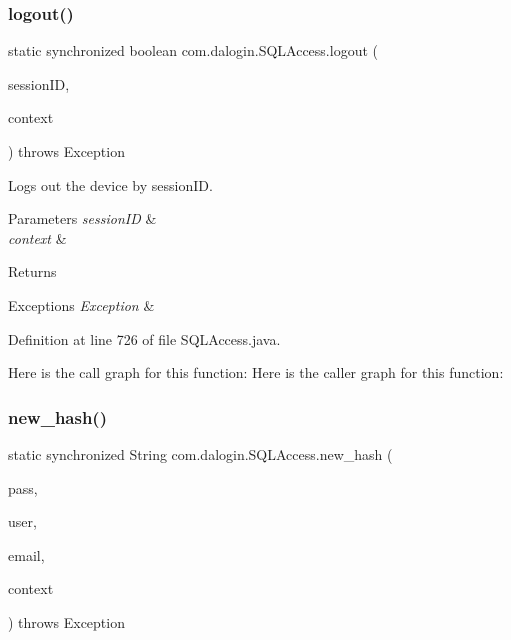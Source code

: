 \subsubsection{\texorpdfstring{logout()}{logout()}}
{\footnotesize\ttfamily static synchronized boolean com.\+dalogin.\+S\+Q\+L\+Access.\+logout (\begin{DoxyParamCaption}\item[{String}]{session\+ID,  }\item[{Servlet\+Context}]{context }\end{DoxyParamCaption}) throws Exception\hspace{0.3cm}{\ttfamily [static]}}

Logs out the device by session\+ID.


\begin{DoxyParams}{Parameters}
{\em session\+ID} & \\
\hline
{\em context} & \\
\hline
\end{DoxyParams}
\begin{DoxyReturn}{Returns}

\end{DoxyReturn}

\begin{DoxyExceptions}{Exceptions}
{\em Exception} & \\
\hline
\end{DoxyExceptions}


Definition at line 726 of file S\+Q\+L\+Access.\+java.

Here is the call graph for this function\+:
Here is the caller graph for this function\+:
\mbox{\label{classcom_1_1dalogin_1_1_s_q_l_access_ac1bccabf13fc7e4268eb1a169aec2aac}} 
\subsubsection{\texorpdfstring{new\+\_\+hash()}{new\_hash()}}
{\footnotesize\ttfamily static synchronized String com.\+dalogin.\+S\+Q\+L\+Access.\+new\+\_\+hash (\begin{DoxyParamCaption}\item[{String}]{pass,  }\item[{String}]{user,  }\item[{String}]{email,  }\item[{Servlet\+Context}]{context }\end{DoxyParamCaption}) throws Exception\hspace{0.3cm}{\ttfamily [static]}}

